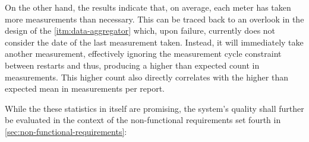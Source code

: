 On the other hand, the results indicate that, on average, each meter has taken more measurements than necessary. This can be traced back to an overlook in the design of the \ref{itm:data-aggregator} which, upon failure, currently does not consider the date of the last measurement taken. Instead, it will immediately take another measurement, effectively ignoring the measurement cycle constraint between restarts and thus, producing a higher than expected count in measurements. This higher count also directly correlates with the higher than expected mean in measurements per report. 

While the these statistics in itself are promising, the system's quality shall further be evaluated in the context of the non-functional requirements set fourth in \autoref{sec:non-functional-requirements}:

